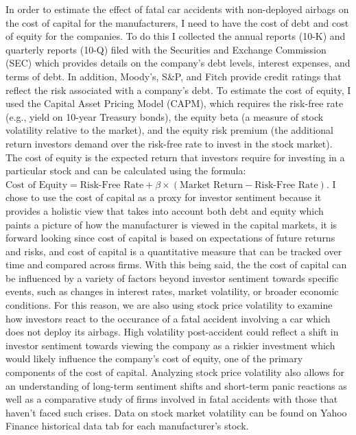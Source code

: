 \documentclass[12pt,a4paper]{article}
\begin{document}
    \hspace{1cm} In order to estimate the effect of fatal car accidents with non-deployed airbags on the cost of capital for the manufacturers, I need to have the cost of debt and cost of equity for the companies. To do this I collected the annual reports (10-K) and quarterly reports (10-Q) filed with the Securities and Exchange Commission (SEC) which provides details on the company's debt levels, interest expenses, and terms of debt. In addition, Moody's, S\&P, and Fitch provide credit ratings that reflect the risk associated with a company's debt. To estimate the cost of equity, I used the Capital Asset Pricing Model (CAPM), which requires the risk-free rate (e.g., yield on 10-year Treasury bonds), the equity beta (a measure of stock volatility relative to the market), and the equity risk premium (the additional return investors demand over the risk-free rate to invest in the stock market). The cost of equity is the expected return that investors require for investing in a particular stock and can be calculated using the formula: $\text{Cost of Equity} = \text{Risk-Free Rate} + \beta \times (\text{Market Return} - \text{Risk-Free Rate})$. I chose to use the cost of capital as a proxy for investor sentiment because it provides a holistic view that takes into account both debt and equity which paints a picture of how the manufacturer is viewed in the capital markets, it is forward looking since cost of capital is based on expectations of future returns and risks, and cost of capital is a quantitative measure that can be tracked over time and compared across firms. With this being said, the the cost of capital can be influenced by a variety of factors beyond investor sentiment towards specific events, such as changes in interest rates, market volatility, or broader economic conditions. For this reason, we are also using stock price volatility to examine how investors react to the occurance of a fatal accident involving a car which does not deploy its airbags. High volatility post-accident could reflect a shift in investor sentiment towards viewing the company as a riskier investment which would likely influence the company's cost of equity, one of the primary components of the cost of capital. Analyzing stock price volatility also allows for an understanding of long-term sentiment shifts and short-term panic reactions as well as a comparative study of firms involved in fatal accidents with those that haven't faced such crises. Data on stock market volatility can be found on Yahoo Finance historical data tab for each manufacturer's stock. 
\end{document}
